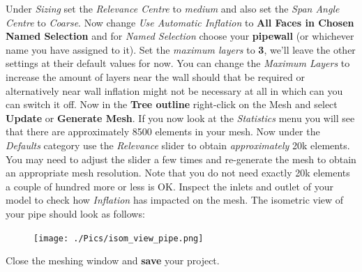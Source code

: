 \documentclass[12pts,a4paper,amsmath,amssymb,floatfix]{article}%
\newcommand\bfr[1]{\textcolor[rgb]{1,0.00,0.00}{\textbf{\textsf{#1}}}}
\begin{document}
\medskip
Under \emph{Sizing} set the \emph{Relevance Centre} to \emph{medium} and also set the \emph{Span Angle Centre} to \emph{Coarse}. Now change \emph{Use Automatic Inflation} to \bfr{All Faces in Chosen Named Selection} and for \emph{Named Selection} choose your \bfr{pipewall} (or whichever name you have assigned to it). Set the \emph{maximum layers} to \bfr{3}, we'll leave the other settings at their default values for now. You can change the \emph{Maximum Layers} to increase the amount of layers near the wall should that be required or alternatively near wall inflation might not be necessary at all in which can you can switch it off. Now in the \bfr{Tree outline} right-click on the Mesh and select \bfr{Update} or \bfr{Generate Mesh}. If you now look at the \emph{Statistics} menu you will see that there are approximately 8500 elements in your mesh. Now under the \emph{Defaults} category use the \emph{Relevance} slider to obtain \emph{approximately} 20k elements. You may need to adjust the slider a few times and re-generate the mesh to obtain an appropriate mesh resolution. Note that you do not need exactly 20k elements a couple of hundred more or less is OK. Inspect the inlets and outlet of your model to check how \emph{Inflation} has impacted on the mesh. The isometric view of your pipe should look as follows:

\begin{figure}[H]
\begin{center}
\texttt{[image: ./Pics/isom\_view\_pipe.png]}
\end{center}
\end{figure}
Close the meshing window and \bfr{save} your project.

\end{document}
